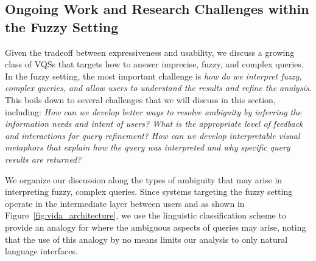 
\subsection{Ongoing Work and Research Challenges within the Fuzzy Setting}
\par Given the tradeoff between 
expressiveness and usability, 
we discuss a growing class of VQSs that targets how to answer imprecise, fuzzy, and complex queries. In the fuzzy setting, the most important challenge is {\em how do we interpret fuzzy, complex queries,
and allow users to understand the results and refine
the analysis}. This boils down to several challenges 
that we will discuss in this section,
including:
{\em How can we develop better ways to
 resolve ambiguity by inferring 
 the information needs and 
 intent of users? 
 What is the appropriate level 
 of feedback and interactions for query refinement? 
 How can we develop interpretable 
 visual metaphors that explain how the query 
 was interpreted and why specific query results are returned?} 

We organize our discussion along the 
types of ambiguity that may arise  
in interpreting fuzzy, complex queries. 
Since systems 
targeting the fuzzy setting 
operate in the intermediate layer 
between users and \vidaql 
as shown in Figure~\ref{fig:vida_architecture}, 
we use the linguistic classification scheme 
to provide an analogy for where the ambiguous 
aspects of queries may arise, 
noting that the use of this analogy 
by no means limits our analysis to only natural language interfaces.


